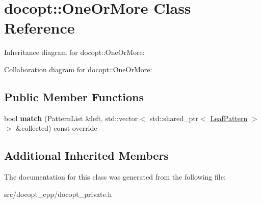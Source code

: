 \hypertarget{classdocopt_1_1OneOrMore}{}\section{docopt\+:\+:One\+Or\+More Class Reference}
\label{classdocopt_1_1OneOrMore}


Inheritance diagram for docopt\+:\+:One\+Or\+More\+:


Collaboration diagram for docopt\+:\+:One\+Or\+More\+:
\subsection*{Public Member Functions}
\begin{DoxyCompactItemize}
\item 
\mbox{\label{classdocopt_1_1OneOrMore_a9a381cacffb24af701a9e9283464fc23}} 
bool {\bfseries match} (Pattern\+List \&left, std\+::vector$<$ std\+::shared\+\_\+ptr$<$ \hyperlink{classdocopt_1_1LeafPattern}{Leaf\+Pattern} $>$$>$ \&collected) const override
\end{DoxyCompactItemize}
\subsection*{Additional Inherited Members}


The documentation for this class was generated from the following file\+:\begin{DoxyCompactItemize}
\item 
src/docopt\+\_\+cpp/docopt\+\_\+private.\+h\end{DoxyCompactItemize}
